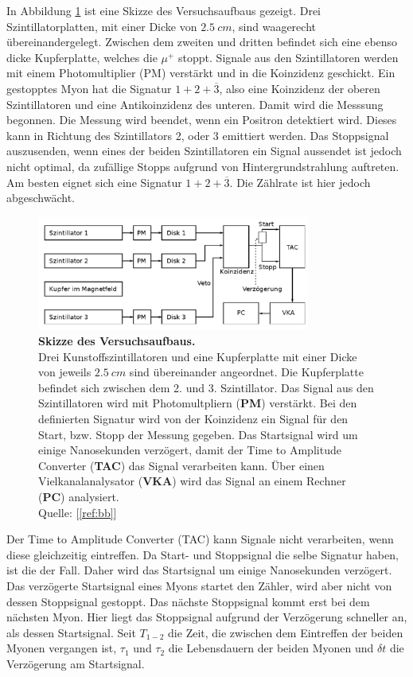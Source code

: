\documentclass[a4paper,ngerman]{scrartcl}
\begin{document}
In Abbildung \ref{fig:aufbau_skizze} ist eine Skizze des Versuchsaufbaus gezeigt. Drei Szintillatorplatten, mit einer Dicke von $\SI{2.5}{cm}$, sind waagerecht übereinandergelegt. Zwischen dem zweiten und dritten befindet sich eine ebenso dicke Kupferplatte, welches die $\mu^{+}$ stoppt. 
Signale aus den Szintillatoren werden mit einem Photomultiplier (PM) verstärkt und in die Koinzidenz geschickt.
Ein gestopptes Myon hat die Signatur $1 + 2 + \overline{3}$, also eine Koinzidenz der oberen Szintillatoren und eine Antikoinzidenz des unteren. Damit wird die Messsung begonnen. Die Messung wird beendet, wenn ein Positron detektiert wird. Dieses kann in Richtung des Szintillators 2, oder 3 emittiert werden. Das Stoppsignal auszusenden, wenn eines der beiden Szintillatoren ein Signal aussendet ist jedoch nicht optimal, da zufällige Stopps aufgrund von Hintergrundstrahlung auftreten. Am besten eignet sich eine Signatur $1 + 2 + \overline{3}$. Die Zählrate ist hier jedoch abgeschwächt.  


\begin{figure}[tb!]
  \centering
  \includegraphics[width=0.8\textwidth]{abbildungen/aufbau_skizze.png}
  \caption{\textbf{Skizze des Versuchsaufbaus.} 
  \\ 
  Drei Kunstoffszintillatoren und eine Kupferplatte mit einer Dicke von jeweils $\SI{2.5}{cm}$ sind übereinander angeordnet. Die Kupferplatte befindet sich zwischen dem 2. und 3. Szintillator. Das Signal aus den Szintillatoren wird mit Photomultpliern (\textbf{PM}) verstärkt. Bei den definierten Signatur wird von der Koinzidenz ein Signal für den Start, bzw. Stopp der Messung gegeben. Das Startsignal wird um einige Nanosekunden verzögert, damit der Time to Amplitude Converter (\textbf{TAC}) das Signal verarbeiten kann. Über einen Vielkanalanalysator (\textbf{VKA}) wird das Signal an einem Rechner (\textbf{PC}) analysiert.
  \\Quelle: [\ref{ref:bb}]}
  \label{fig:aufbau_skizze}
\end{figure}

Der Time to Amplitude Converter (TAC) kann Signale nicht verarbeiten, wenn diese gleichzeitig eintreffen. Da Start- und Stoppsignal die selbe Signatur haben, ist die der Fall. 
Daher wird das Startsignal um einige Nanosekunden verzögert. 
Das verzögerte Startsignal eines Myons startet den Zähler, wird aber nicht von dessen Stoppsignal gestoppt. Das nächste Stoppsignal kommt erst bei dem nächsten Myon. Hier liegt das Stoppsignal aufgrund der Verzögerung schneller an, als dessen Startsignal. Seit $T_{1-2}$ die Zeit, die zwischen dem Eintreffen der beiden Myonen vergangen ist, $\tau_1$ und $\tau_2$ die Lebensdauern der beiden Myonen und $\delta t$ die Verzögerung am Startsignal. 
\end{document}
